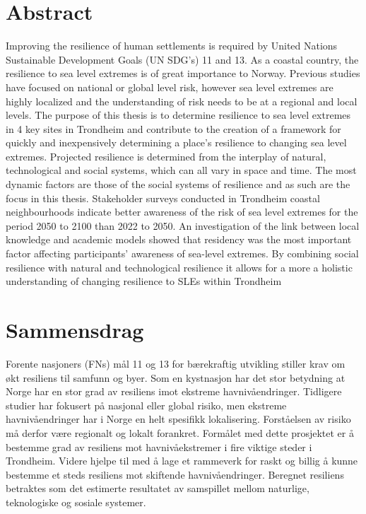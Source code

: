 

\section{Abstract}

Improving the resilience of human settlements is required by United Nations Sustainable Development Goals (UN SDG's) 11 and 13. As a coastal country, the resilience to sea level extremes is of great importance to Norway. Previous studies have focused on national or global level risk, however sea level extremes are highly localized  and the understanding of risk needs to be at a regional and local levels. The purpose of this thesis is to determine resilience to sea level extremes in 4 key sites in Trondheim and contribute to the creation of a framework for quickly and inexpensively determining a place's resilience to changing sea level extremes. Projected resilience is determined from the interplay of natural, technological and social systems, which can all vary in space and time. The most dynamic factors are those of the social systems of resilience and as such are the focus in this thesis. Stakeholder surveys conducted in Trondheim coastal neighbourhoods indicate better awareness of the risk of sea level extremes for the period 2050 to 2100 than 2022 to 2050. An  investigation of the link between local knowledge and academic models showed that residency was the most important factor affecting participants' awareness of sea-level extremes.  By combining social resilience with natural and technological resilience it allows for a more a holistic understanding of changing resilience to SLEs within Trondheim
   

\newpage

\section{Sammensdrag}
Forente nasjoners (FNs) mål 11 og 13 for bærekraftig utvikling stiller krav om økt resiliens til samfunn og byer. Som en kystnasjon har det stor betydning at Norge har en stor grad av resiliens imot ekstreme havnivåendringer. Tidligere studier har fokusert på nasjonal eller global risiko, men ekstreme havnivåendringer har i Norge en helt spesifikk lokalisering. Forståelsen av risiko må derfor være regionalt og lokalt forankret. Formålet med dette prosjektet er å bestemme grad av resiliens mot havnivåekstremer i fire viktige steder i Trondheim. Videre hjelpe til med å lage et rammeverk for raskt og billig å kunne bestemme et steds resiliens mot skiftende havnivåendringer. Beregnet resiliens betraktes som det estimerte resultatet av samspillet mellom naturlige, teknologiske og sosiale systemer. 

